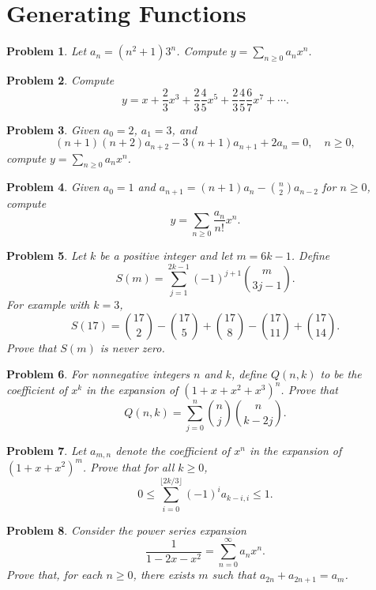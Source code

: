 \documentclass[12pt]{article}
\newtheorem{problem}{Problem}
\begin{document}
\section*{Generating Functions}

\begin{problem}
Let $a_n = (n^2 + 1)3^n$. Compute $y = \sum_{n \geq 0} a_n x^n$.
\end{problem}

\begin{problem}
Compute
\[
y = x + \frac{2}{3}x^3 + \frac{2}{3}\frac{4}{5}x^5 + \frac{2}{3}\frac{4}{5}\frac{6}{7}x^7 + \cdots.
\]
\end{problem}

\begin{problem}
Given $a_0 = 2$, $a_1 = 3$, and
\[
(n+1)(n+2)a_{n+2} - 3(n+1)a_{n+1} + 2a_n = 0, \quad n \geq 0,
\]
compute $y = \sum_{n \geq 0} a_n x^n$.
\end{problem}

\begin{problem}
Given $a_0 = 1$ and $a_{n+1} = (n+1)a_n - \binom{n}{2} a_{n-2}$ for $n \geq 0$, compute
\[
y = \sum_{n \geq 0} \frac{a_n}{n!} x^n.
\]
\end{problem}

\begin{problem}
Let $k$ be a positive integer and let $m = 6k - 1$. Define
\[
S(m) = \sum_{j=1}^{2k-1} (-1)^{j+1} \binom{m}{3j-1}.
\]
For example with $k=3$,
\[
S(17) = \binom{17}{2} - \binom{17}{5} + \binom{17}{8} - \binom{17}{11} + \binom{17}{14}.
\]
Prove that $S(m)$ is never zero.
\end{problem}

\begin{problem}
For nonnegative integers $n$ and $k$, define $Q(n,k)$ to be the coefficient of $x^k$ in the expansion of $(1+x+x^2+x^3)^n$. Prove that
\[
Q(n,k) = \sum_{j=0}^n \binom{n}{j}\binom{n}{k-2j}.
\]
\end{problem}

\begin{problem}
Let $a_{m,n}$ denote the coefficient of $x^n$ in the expansion of $(1+x+x^2)^m$. Prove that for all $k \geq 0$,
\[
0 \leq \sum_{i=0}^{\lfloor 2k/3 \rfloor} (-1)^i a_{k-i,i} \leq 1.
\]
\end{problem}

\begin{problem}
Consider the power series expansion
\[
\frac{1}{1-2x-x^2} = \sum_{n=0}^\infty a_n x^n.
\]
Prove that, for each $n \geq 0$, there exists $m$ such that $a_{2n} + a_{2n+1} = a_m$.
\end{problem}
\end{document}

